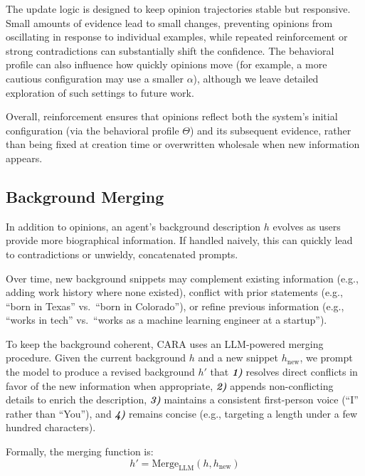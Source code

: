 The update logic is designed to keep opinion trajectories stable but responsive. Small amounts of evidence lead to small changes, preventing opinions from oscillating in response to individual examples, while repeated reinforcement or strong contradictions can substantially shift the confidence. The behavioral profile can also influence how quickly opinions move (for example, a more cautious configuration may use a smaller $\alpha$), although we leave detailed exploration of such settings to future work.

Overall, reinforcement ensures that opinions reflect both the system's initial configuration (via the behavioral profile $\Theta$) and its subsequent evidence, rather than being fixed at creation time or overwritten wholesale when new information appears.

\subsection{Background Merging}

In addition to opinions, an agent's background description $h$ evolves as users provide more biographical information. If handled naively, this can quickly lead to contradictions or unwieldy, concatenated prompts.

Over time, new background snippets may complement existing information (e.g., adding work history where none existed), conflict with prior statements (e.g., ``born in Texas'' vs.\ ``born in Colorado''), or refine previous information (e.g., ``works in tech'' vs.\ ``works as a machine learning engineer at a startup'').

To keep the background coherent, CARA uses an LLM-powered merging procedure. Given the current background $h$ and a new snippet $h_{\text{new}}$, we prompt the model to produce a revised background $h'$ that \textbf{\textit{1)}} resolves direct conflicts in favor of the new information when appropriate, \textbf{\textit{2)}} appends non-conflicting details to enrich the description, \textbf{\textit{3)}} maintains a consistent first-person voice (``I'' rather than ``You''), and \textbf{\textit{4)}} remains concise (e.g., targeting a length under a few hundred characters).

Formally, the merging function is:
\begin{equation}
h' = \text{Merge}_{\text{LLM}}(h, h_{\text{new}})
\end{equation}

